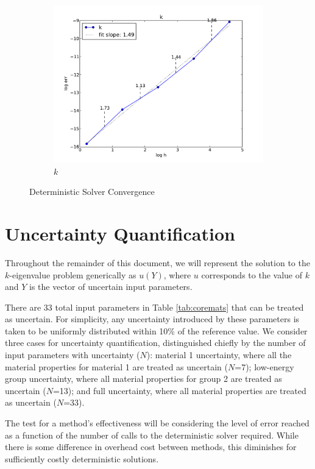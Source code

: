 \documentclass{mc2015}
\begin{document}
\begin{figure}[h]
\begin{subfigure}[b]{0.3 \textwidth}
   \includegraphics[width=\textwidth]{k}
   \caption{$k$}
   \label{kconv}
  \end{subfigure}
  \caption{Deterministic Solver Convergence}
  \label{det-conv}
\end{figure}


\section{Uncertainty Quantification}
Throughout the remainder of this document, we will represent the solution to the $k$-eigenvalue problem generically as $u(Y)$, where $u$ corresponds to the value of $k$ and $Y$ is the vector of uncertain input parameters.

There are 33 total input parameters in Table \ref{tab:coremats} that can be treated as uncertain.  For simplicity, any uncertainty introduced by these parameters is taken to be uniformly distributed within 10\% of the reference value.  We consider three cases for uncertainty quantification, distinguished chiefly by the number of input parameters with uncertainty ($N$): material 1 uncertainty, where all the material properties for material 1 are treated as uncertain ($N$=7); low-energy group uncertainty, where all material properties for group 2 are treated as uncertain ($N$=13); and full uncertainty, where all material properties are treated as uncertain ($N$=33).

The test for a method's effectiveness will be considering the level of error reached as a function of the number of calls to the deterministic solver required.  While there is some difference in overhead cost between methods, this diminishes for sufficiently costly deterministic solutions.
\end{document}
